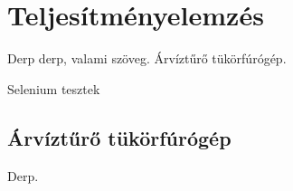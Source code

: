 \chapter{Teljesítményelemzés}
Derp derp, valami szöveg. Árvíztűrő tükörfúrógép.

Selenium tesztek


\section{Árvíztűrő tükörfúrógép}
Derp.



